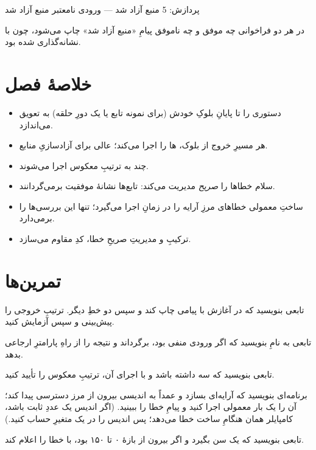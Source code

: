\begin{progoutfa}
پردازش: 5
منبع آزاد شد
---
ورودی نامعتبر
منبع آزاد شد
\end{progoutfa}

در هر دو فراخوانی چه موفق و چه ناموفق پیامِ «منبع آزاد شد» چاپ می‌شود،
چون با  نشانه‌گذاری شده بود.

\section{خلاصهٔ فصل}

\begin{itemize}
  \item {} دستوری را تا پایانِ بلوکِ خودش (برای نمونه تابع یا یک دورِ
        حلقه) به تعویق می‌اندازد.
  \item هر مسیرِ خروج از بلوک، ها را اجرا می‌کند؛ عالی برای
        آزادسازیِ منابع.
  \item چند  به ترتیبِ معکوس اجرا می‌شوند.
  \item سلام خطاها را \emph{صریح} مدیریت می‌کند: تابع‌ها نشانهٔ موفقیت
        برمی‌گردانند.
  \item ساختِ معمولی خطاهای مرزِ آرایه را در زمانِ اجرا می‌گیرد؛ تنها
         این بررسی‌ها را برمی‌دارد.
  \item ترکیبِ  و مدیریتِ صریحِ خطا، کدِ مقاوم می‌سازد.
\end{itemize}

\section{تمرین‌ها}

\exercise تابعی بنویسید که در آغازش با  پیامی چاپ کند و سپس دو خطِ
دیگر. ترتیبِ خروجی را پیش‌بینی و سپس آزمایش کنید.

\exercise تابعی به نامِ  بنویسید که اگر ورودی منفی بود،
 برگرداند و نتیجه را از راهِ پارامترِ ارجاعی بدهد.

\exercise تابعی بنویسید که سه  داشته باشد و با اجرای آن، ترتیبِ
معکوس را تأیید کنید.

\exercise برنامه‌ای بنویسید که آرایه‌ای بسازد و عمداً به اندیسی بیرون از مرز
دسترسی پیدا کند؛ آن را یک بار معمولی اجرا کنید و پیامِ خطا را ببینید. (اگر اندیس
یک عددِ ثابت باشد، کامپایلر همان هنگامِ ساخت خطا می‌دهد؛ پس اندیس را در یک
متغیرِ  حساب کنید.)

\exercise تابعی بنویسید که یک سن بگیرد و اگر بیرون از بازهٔ ۰ تا ۱۵۰ بود، با
 خطا را اعلام کند.
